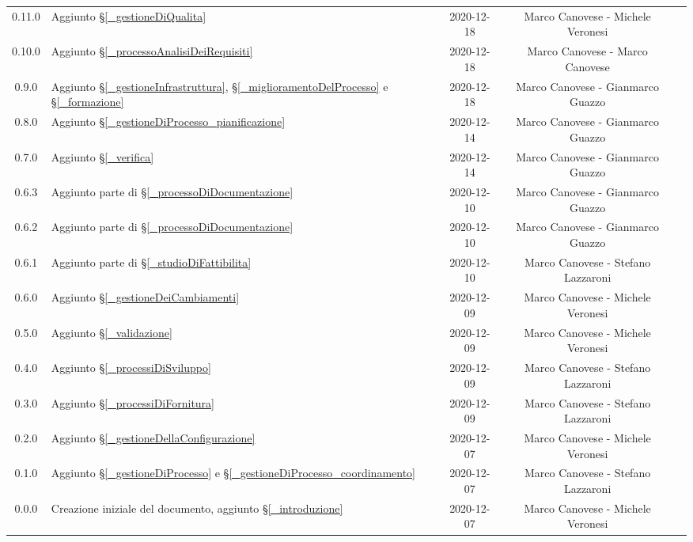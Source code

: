 \begin{center}
\begin{longtable}{|c|p{5cm}|c|c|c|}
		0.11.0 & Aggiunto \S\ref{_gestioneDiQualita} & 2020-12-18 & Marco Canovese - Michele Veronesi \\
		0.10.0 & Aggiunto \S\ref{_processoAnalisiDeiRequisiti} & 2020-12-18 & Marco Canovese - Marco Canovese  \\
		0.9.0 & Aggiunto \S\ref{_gestioneInfrastruttura}, \S\ref{_miglioramentoDelProcesso} e \S\ref{_formazione} & 2020-12-18 & Marco Canovese - Gianmarco Guazzo  \\
		0.8.0 & Aggiunto \S\ref{_gestioneDiProcesso_pianificazione} & 2020-12-14 & Marco Canovese - Gianmarco Guazzo \\
		0.7.0 & Aggiunto \S\ref{_verifica} & 2020-12-14& Marco Canovese - Gianmarco Guazzo \\
		0.6.3 & Aggiunto parte di \S\ref{_processoDiDocumentazione} & 2020-12-10 & Marco Canovese - Gianmarco Guazzo \\
		0.6.2 & Aggiunto parte di \S\ref{_processoDiDocumentazione} & 2020-12-10 & Marco Canovese - Gianmarco Guazzo \\
		0.6.1 & Aggiunto parte di \S\ref{_studioDiFattibilita} & 2020-12-10 & Marco Canovese - Stefano Lazzaroni  \\
		0.6.0 & Aggiunto \S\ref{_gestioneDeiCambiamenti} & 2020-12-09 & Marco Canovese - Michele Veronesi \\
		0.5.0 & Aggiunto \S\ref{_validazione} & 2020-12-09 & Marco Canovese - Michele Veronesi  \\
		0.4.0 & Aggiunto \S\ref{_processiDiSviluppo} & 2020-12-09 & Marco Canovese - Stefano Lazzaroni  \\
		0.3.0 & Aggiunto \S\ref{_processiDiFornitura} & 2020-12-09 & Marco Canovese - Stefano Lazzaroni \\
		0.2.0 & Aggiunto \S\ref{_gestioneDellaConfigurazione} & 2020-12-07 & Marco Canovese - Michele Veronesi  \\
		0.1.0 & Aggiunto \S\ref{_gestioneDiProcesso} e \S\ref{_gestioneDiProcesso_coordinamento} & 2020-12-07 & Marco Canovese - Stefano Lazzaroni \\
		0.0.0 & Creazione iniziale del documento, aggiunto \S\ref{_introduzione} & 2020-12-07 & Marco Canovese - Michele Veronesi \\
		
		\hline
	\end{longtable}
\end{center}